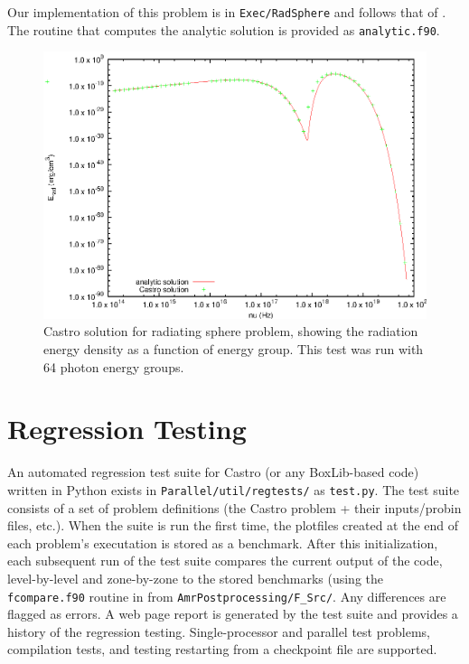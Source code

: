 Our implementation of this problem is in {\tt Exec/RadSphere} and
follows that of \cite{swestymyra:2009}.  The routine that computes
the analytic solution is provided as {\tt analytic.f90}.

\begin{figure}[h]
\centering
\includegraphics[width=5.0in]{CastroVerification/radiating_sphere}
\caption{\label{fig:radsphere} Castro solution for radiating sphere problem,
  showing the radiation energy density as a function of energy group.
  This test was run with 64 photon energy groups.}
\end{figure}


\section{Regression Testing}

An automated regression test suite for Castro (or any BoxLib-based
code) written in Python exists in {\tt Parallel/util/regtests/} as
{\tt test.py}.  The test suite consists of a set of problem
definitions (the Castro problem + their inputs/probin files, etc.).
When the suite is run the first time, the plotfiles created at the end
of each problem's executation is stored as a benchmark.  After this
initialization, each subsequent run of the test suite compares the
current output of the code, level-by-level and zone-by-zone to the
stored benchmarks (using the {\tt fcompare.f90} routine in 
from {\tt AmrPostprocessing/F\_Src/}. Any differences are flagged as 
errors.  A web page report is generated by the test suite and provides
a history of the regression testing.  Single-processor and parallel
test problems, compilation tests, and testing restarting from a
checkpoint file are supported.


